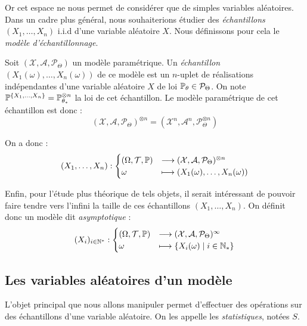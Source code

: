 Or cet espace ne nous permet de considérer que de simples variables aléatoires. Dans un cadre plus général, 
nous souhaiterions étudier des \emph{échantillons} $(X_1, \dots, X_n)$ i.i.d d'une variable aléatoire 
$X$. Nous définissons pour cela le \emph{modèle d'échantillonnage}. 

\begin{definition}
    Soit $( \mathcal{X}, \mathcal{A}, \mathcal{P}_{\Theta})$ un modèle paramétrique. 
    Un \emph{échantillon} $(X_1( \omega), \dots, X_n( \omega))$ de ce modèle est un $n$-uplet de réalisations 
    indépendantes d'une variable aléatoire $X$ de loi $ \mathbb{P}_\theta \in \mathcal{P}_\Theta$. 
    On note $ \mathbb{P}^{\{X_1, \dots, X_n\}} = \mathbb{P}_{\theta_*}^{ \otimes n}$ la loi de cet échantillon. Le modèle 
    paramétrique de cet échantillon est donc : 
        $$ ( \mathcal{X}, \mathcal{A}, \mathcal{P}_\Theta)^{\otimes n} = ( \mathcal{X}^n, \mathcal{A}^n, \mathcal{P}_{\Theta}^{\otimes n}) $$
\end{definition}

On a donc : 
    $$ 
        (X_1, \dots, X_n) : 
            \begin{cases}
                ( \Omega, \mathcal{T}, \mathbb{P}) &\longrightarrow ( \mathcal{X}, \mathcal{A}, \mathcal{P}_\Theta)^{\otimes n} \\ 
                \omega &\longmapsto (X_1( \omega), \dots, X_n( \omega))
            \end{cases}
    $$

Enfin, pour l'étude plus théorique de tels objets, il serait intéressant de pouvoir faire 
tendre vers l'infini la taille de ces échantillons $(X_1, \dots, X_n)$. On définit donc un 
modèle dit \emph{asymptotique} : 
    $$ 
        (X_i)_{i \in \mathbb{N}^*} : 
        \begin{cases}
            ( \Omega, \mathcal{T}, \mathbb{P}) & \longrightarrow ( \mathcal{X}, \mathcal{A}, \mathcal{P}_\Theta)^\infty \\ 
            \omega & \longmapsto \{X_i( \omega) \mid i \in \mathbb{N}_*\}
        \end{cases}
    $$


\subsection{Les variables aléatoires d'un modèle}

L'objet principal que nous allons manipuler permet d'effectuer des opérations sur des échantillons 
d'une variable aléatoire. On les appelle les \emph{statistiques}, notées $S$. 

